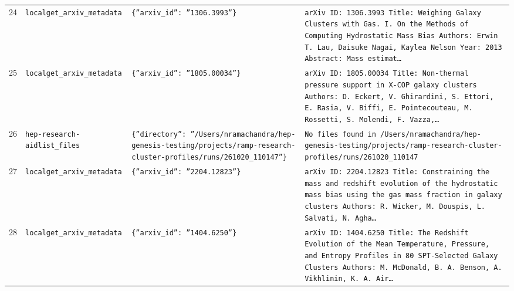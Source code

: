 \documentclass[11pt,a4paper]{article}
\begin{document}
\begin{longtable}{@{}p{}p{}p{}p{}@{}}
24 & \texttt{local}\newline\texttt{get\_\allowbreak{}arxiv\_\allowbreak{}metadata} & \texttt{\{''arxiv\_\allowbreak{}id'':\allowbreak{} ''1306.3993''\}\allowbreak{}} & \texttt{arXiv ID:\allowbreak{} 1306.3993 Title:\allowbreak{} Weighing Galaxy Clusters with Gas. I. On the Methods of Computing Hydrostatic Mass Bias Authors:\allowbreak{} Erwin T. Lau,\allowbreak{} Daisuke Nagai,\allowbreak{} Kaylea Nelson Year:\allowbreak{} 2013 Abstract:\allowbreak{} Mass estimat\ldots{}\allowbreak{}} \\
25 & \texttt{local}\newline\texttt{get\_\allowbreak{}arxiv\_\allowbreak{}metadata} & \texttt{\{''arxiv\_\allowbreak{}id'':\allowbreak{} ''1805.00034''\}\allowbreak{}} & \texttt{arXiv ID:\allowbreak{} 1805.00034 Title:\allowbreak{} Non-thermal pressure support in X-COP galaxy clusters Authors:\allowbreak{} D. Eckert,\allowbreak{} V. Ghirardini,\allowbreak{} S. Ettori,\allowbreak{} E. Rasia,\allowbreak{} V. Biffi,\allowbreak{} E. Pointecouteau,\allowbreak{} M. Rossetti,\allowbreak{} S. Molendi,\allowbreak{} F. Vazza,\allowbreak{}\ldots{}\allowbreak{}} \\
26 & \texttt{hep-research-aid}\newline\texttt{list\_\allowbreak{}files} & \texttt{\{''directory'':\allowbreak{} ''/\allowbreak{}Users/\allowbreak{}nramachandra/\allowbreak{}hep-genesis-testing/\allowbreak{}projects/\allowbreak{}ramp-research-cluster-profiles/\allowbreak{}runs/\allowbreak{}261020\_\allowbreak{}110147''\}\allowbreak{}} & \texttt{No files found in /\allowbreak{}Users/\allowbreak{}nramachandra/\allowbreak{}hep-genesis-testing/\allowbreak{}projects/\allowbreak{}ramp-research-cluster-profiles/\allowbreak{}runs/\allowbreak{}261020\_\allowbreak{}110147} \\
27 & \texttt{local}\newline\texttt{get\_\allowbreak{}arxiv\_\allowbreak{}metadata} & \texttt{\{''arxiv\_\allowbreak{}id'':\allowbreak{} ''2204.12823''\}\allowbreak{}} & \texttt{arXiv ID:\allowbreak{} 2204.12823 Title:\allowbreak{} Constraining the mass and redshift evolution of the hydrostatic mass bias using the gas mass fraction in galaxy clusters Authors:\allowbreak{} R. Wicker,\allowbreak{} M. Douspis,\allowbreak{} L. Salvati,\allowbreak{} N. Agha\ldots{}\allowbreak{}} \\
28 & \texttt{local}\newline\texttt{get\_\allowbreak{}arxiv\_\allowbreak{}metadata} & \texttt{\{''arxiv\_\allowbreak{}id'':\allowbreak{} ''1404.6250''\}\allowbreak{}} & \texttt{arXiv ID:\allowbreak{} 1404.6250 Title:\allowbreak{} The Redshift Evolution of the Mean Temperature,\allowbreak{} Pressure,\allowbreak{} and Entropy Profiles in 80 SPT-Selected Galaxy Clusters Authors:\allowbreak{} M. McDonald,\allowbreak{} B. A. Benson,\allowbreak{} A. Vikhlinin,\allowbreak{} K. A. Air\ldots{}\allowbreak{}} \\

\end{longtable}
\end{document}

